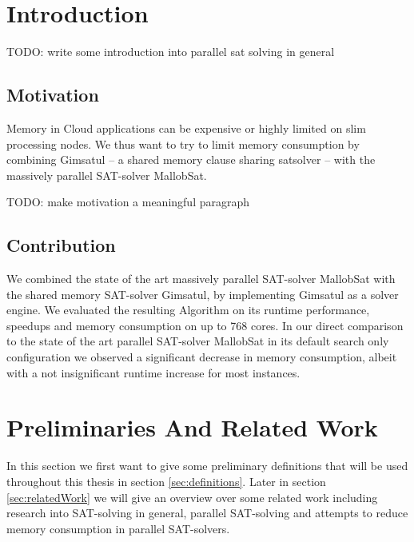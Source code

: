 \documentclass[12pt,a4paper,twoside]{scrartcl}
\numberwithin{equation}{section}
\begin{document}
\tableofcontents

\clearpage


\listoffigures
\listoftables

\clearpage


\section{Introduction}

TODO: write some introduction into parallel sat solving in general

\subsection{Motivation}

Memory in Cloud applications can be expensive or highly limited on slim processing nodes. We thus want to try to limit memory consumption by combining Gimsatul -- a shared memory clause sharing satsolver -- with the massively parallel SAT-solver MallobSat.


TODO: make motivation a meaningful paragraph

\subsection{Contribution}

We combined the state of the art massively parallel SAT-solver MallobSat with the shared memory SAT-solver Gimsatul, by implementing Gimsatul as a solver engine. We evaluated the resulting Algorithm on its runtime performance, speedups and memory consumption on up to 768 cores. In our direct comparison to the state of the art parallel SAT-solver MallobSat in its default search only configuration we observed a significant decrease in memory consumption, albeit with a not insignificant runtime increase for most instances.


\section{Preliminaries And Related Work}

In this section we first want to give some preliminary definitions that will be used throughout this thesis in section \ref{sec:definitions}. Later in section \ref{sec:relatedWork} we will give an overview over some related work including research into SAT-solving in general, parallel SAT-solving and attempts to reduce memory consumption in parallel SAT-solvers.
\end{document}
